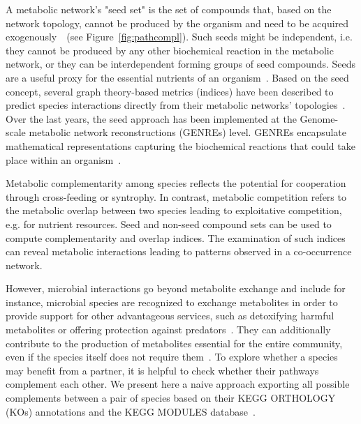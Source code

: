 \documentclass[sn-mathphys,Numbered]{sn-jnl}  %
\theoremstyle{thmstyleone}%
\theoremstyle{thmstyletwo}%
\theoremstyle{thmstylethree}%
\begin{document}
    A metabolic network's "seed set" is the set of compounds that, based on the network topology, cannot be produced by the organism and need to be acquired exogenously~\cite{borenstein2008large}~(see Figure~\ref{fig:pathcompl}).
    Such seeds might be independent, i.e. they cannot be produced by any other biochemical reaction in the metabolic network, or they can be interdependent forming groups of seed compounds.
    Seeds are a useful proxy for the essential nutrients of an organism~\cite{parter2007environmental,borenstein2008large}.
    Based on the seed concept, several graph theory-based metrics (indices) have been described to predict species interactions directly from their metabolic networks' topologies~\cite{levy2015netcooperate, kreimer2012netcmpt, zelezniak2015metabolic, belcour2020metage2metabo}.
    Over the last years, the seed approach has been implemented at the Genome-scale metabolic network reconstructions (GENREs) level.
    GENREs encapsulate mathematical representations capturing the biochemical reactions that could take place within an organism~\cite{thiele2010protocol, durot2008genome, communityGemMicrobiomeModel2023}.

    Metabolic complementarity among species reflects the potential for cooperation 
    through cross-feeding or syntrophy. 
    In contrast, metabolic competition refers to the metabolic overlap between two species leading to exploitative competition, e.g. for nutrient resources.
    Seed and non-seed compound sets can be used to compute complementarity and overlap indices. 
    The examination of such indices can reveal metabolic interactions leading to patterns observed in a co-occurrence network.
    
    However, microbial interactions go beyond metabolite exchange and include
    for instance, microbial species are recognized to exchange metabolites in order to provide support for other advantageous services, such as 
    detoxifying harmful metabolites or offering protection against predators~\cite{little2008rules, zientz2004metabolic}.
    They can additionally contribute to the production of metabolites essential for the entire community, even if the species itself does not require them~\cite{kallus2017paradoxes}.
    To explore whether a species may benefit from a partner, 
    it is helpful to check whether their pathways complement each other.
    We present here a naive approach exporting all possible complements between a pair of species based on their KEGG ORTHOLOGY (KOs) annotations and the KEGG MODULES database~\cite{keggmodulesdb}.
\end{document}
